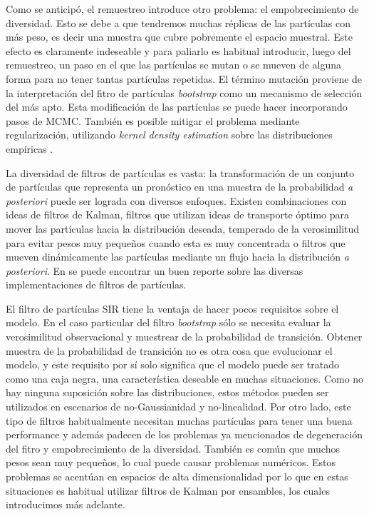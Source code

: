 Como se anticipó, el remuestreo introduce otro problema: el empobrecimiento de diversidad. Esto se debe a que tendremos muchas réplicas de las partículas con más peso, es decir una muestra que cubre pobremente el espacio muestral. Este efecto es claramente indeseable y para paliarlo es habitual introducir, luego del remuestreo, un paso en el que las partículas se mutan o se mueven de alguna forma para no tener tantas partículas repetidas. El término mutación proviene de la interpretación del fitro de partículas \textit{bootstrap} como un mecanismo de selección del más apto. Esta modificación de las partículas se puede hacer incorporando pasos de MCMC. También es posible mitigar el problema mediante regularización, utilizando \textit{kernel density estimation} sobre las distribuciones empíricas \citep{Sarkka2013, Arulampalam2002, Ruchi2019}.

La diversidad de filtros de partículas es vasta: la transformación de un conjunto de partículas que representa un pronóstico en una muestra de la probabilidad \textit{a posteriori} puede ser lograda con diversos enfoques. Existen combinaciones con ideas de filtros de Kalman, filtros que utilizan ideas de transporte óptimo para mover las partículas hacia la distribución deseada, temperado de la verosimilitud para evitar pesos muy pequeños cuando esta es muy concentrada o filtros que mueven dinámicamente las partículas mediante un flujo hacia la distribución \textit{a posteriori}. En \cite{vanLeeuwen2019} se puede encontrar un buen reporte sobre las diversas implementaciones de filtros de partículas. 

El filtro de partículas SIR tiene la ventaja de hacer pocos requisitos sobre el modelo. En el caso particular del filtro \textit{bootstrap} sólo se necesita evaluar la verosimilitud observacional y muestrear de la probabilidad de transición. Obtener muestra de la probabilidad de transición no es otra cosa que evolucionar el modelo, y este requisito por sí solo significa que el modelo puede ser tratado como una caja negra, una característica deseable en muchas situaciones. Como no hay ninguna suposición sobre las distribuciones, estos métodos pueden ser utilizados en escenarios de no-Gaussianidad y no-linealidad. Por otro lado, este tipo de filtros habitualmente necesitan muchas partículas para tener una buena performance y además padecen de los problemas ya mencionados de degeneración del fitro y empobrecimiento de la diversidad. También es común que muchos pesos sean muy pequeños, lo cual puede causar problemas numéricos. Estos problemas se acentúan en espacios de alta dimensionalidad por lo que en estas situaciones es habitual utilizar filtros de Kalman por ensambles, los cuales introducimos más adelante.

